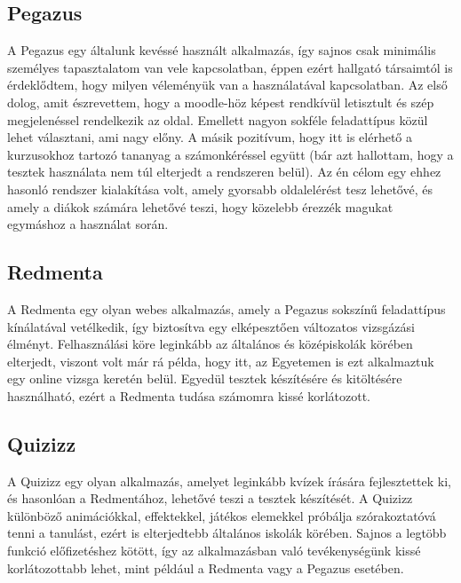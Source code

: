 \documentclass[
]{thesis-ekf}
\theoremstyle{definition}
\theoremstyle{remark}
\begin{document}
	\subsection{Pegazus}
	A Pegazus\cite{Pegazus} egy általunk kevéssé használt alkalmazás, így sajnos csak minimális személyes tapasztalatom van vele kapcsolatban, éppen ezért hallgató társaimtól is érdeklődtem, hogy milyen véleményük van a használatával kapcsolatban. Az első dolog, amit észrevettem, hogy a moodle-höz képest rendkívül letisztult és szép megjelenéssel rendelkezik az oldal. Emellett nagyon sokféle feladattípus közül lehet választani, ami nagy előny. A másik pozitívum, hogy itt is elérhető a kurzusokhoz tartozó tananyag a számonkéréssel együtt (bár azt hallottam, hogy a tesztek használata nem túl elterjedt a rendszeren belül). Az én célom egy ehhez hasonló rendszer kialakítása volt, amely gyorsabb oldalelérést tesz lehetővé, és amely a diákok számára lehetővé teszi, hogy közelebb érezzék magukat egymáshoz a használat során.
	
	\subsection{Redmenta}
	A Redmenta\cite{Redmenta} egy olyan webes alkalmazás, amely a Pegazus sokszínű feladattípus kínálatával vetélkedik, így biztosítva egy elképesztően változatos vizsgázási élményt. Felhasználási köre leginkább az általános és középiskolák körében elterjedt, viszont volt már rá példa, hogy itt, az Egyetemen is ezt alkalmaztuk egy online vizsga keretén belül. Egyedül tesztek készítésére és kitöltésére használható, ezért a Redmenta tudása számomra kissé korlátozott.
	
	\subsection{Quizizz}
	A Quizizz\cite{Quizizz} egy olyan alkalmazás, amelyet leginkább kvízek írására fejlesztettek ki, és hasonlóan a Redmentához, lehetővé teszi a tesztek készítését. A Quizizz különböző animációkkal, effektekkel, játékos elemekkel próbálja szórakoztatóvá tenni a tanulást, ezért is elterjedtebb általános iskolák körében. Sajnos a legtöbb funkció előfizetéshez kötött, így az alkalmazásban való tevékenységünk kissé korlátozottabb lehet, mint például a Redmenta vagy a Pegazus esetében.
	
\end{document}
